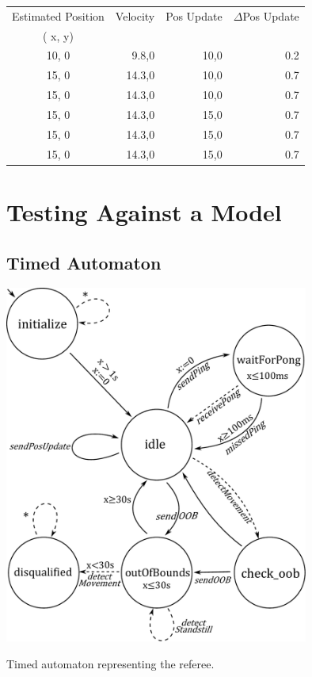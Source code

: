 \documentclass[12pt]{article}
\begin{document}
\begin{tabular}{ | c || r | r | r | }
\hline
Estimated Position & Velocity & Pos Update &  $\Delta$Pos Update \\
 ( x, y) & & &  \\ \hline
10, 0 & 9.8,0 & 10,0 & 0.2  \\ \hline
15, 0 & 14.3,0 & 10,0 & 0.7 \\ \hline
15, 0 & 14.3,0 & 10,0 & 0.7 \\ \hline
15, 0 & 14.3,0 & 15,0 & 0.7 \\ \hline
15, 0 & 14.3,0 & 15,0 & 0.7 \\ \hline
15, 0 & 14.3,0 & 15,0 & 0.7 \\ \hline
\end{tabular}

\section*{Testing Against a Model}

\subsection*{Timed Automaton}
\begin{center}


\includegraphics[width = 0.75\textwidth]{images/ref_ta.pdf}

Timed automaton representing the referee.

\end{center}
\end{document}
